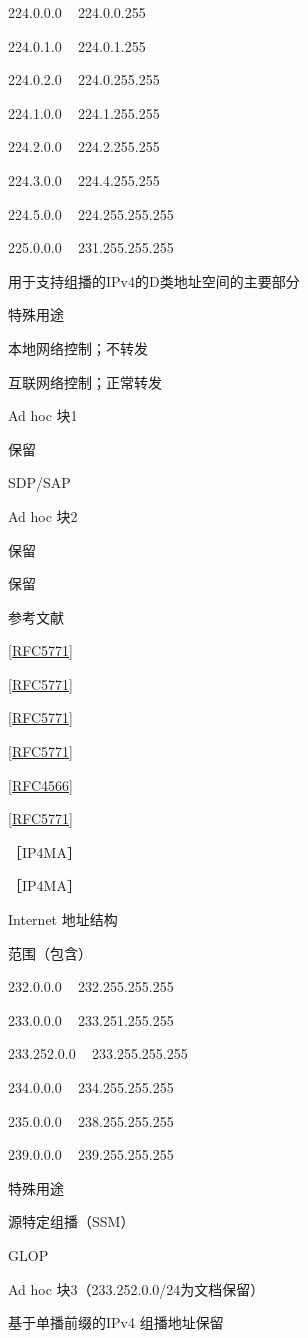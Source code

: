224.0.0.0 ~ 224.0.0.255

224.0.1.0 ~ 224.0.1.255

224.0.2.0 ~ 224.0.255.255

224.1.0.0 ~ 224.1.255.255

224.2.0.0 ~ 224.2.255.255

224.3.0.0 ~ 224.4.255.255

224.5.0.0 ~ 224.255.255.255

225.0.0.0 ~ 231.255.255.255

用于支持组播的IPv4的D类地址空间的主要部分

特殊用途

本地网络控制；不转发

互联网络控制；正常转发

Ad hoc 块1

保留

SDP/SAP

Ad hoc 块2

保留

保留

参考文献

\href{https://www.rfc-editor.org/rfc/rfc5771}{[RFC5771]}

\href{https://www.rfc-editor.org/rfc/rfc5771}{[RFC5771]}

\href{https://www.rfc-editor.org/rfc/rfc5771}{[RFC5771]}

\href{https://www.rfc-editor.org/rfc/rfc5771}{[RFC5771]}

\href{https://www.rfc-editor.org/rfc/rfc4566}{[RFC4566]}

\href{https://www.rfc-editor.org/rfc/rfc5771}{[RFC5771]}

［IP4MA］

［IP4MA］

Internet 地址结构

范围（包含）

232.0.0.0 ~ 232.255.255.255

233.0.0.0 ~ 233.251.255.255

233.252.0.0 ~ 233.255.255.255

234.0.0.0 ~ 234.255.255.255

235.0.0.0 ~ 238.255.255.255

239.0.0.0 ~ 239.255.255.255

特殊用途

源特定组播（SSM）

GLOP

Ad hoc 块3（233.252.0.0/24为文档保留）

基于单播前缀的IPv4 组播地址保留


